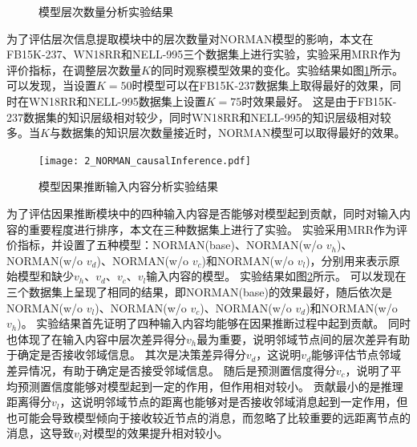 \documentclass[algorithmlist, AutoFakeBold, AutoFakeSlant, figurelist, tablelist, nomlist, engineering]{seuthesix}
\begin{document}
\begin{figure}[t]
  \centering
  \caption{模型层次数量分析实验结果}
  \label{Experiment1_layer}
\end{figure}
为了评估层次信息提取模块中的层次数量对NORMAN模型的影响，本文在FB15K-237、WN18RR和NELL-995三个数据集上进行实验，实验采用MRR作为评价指标，在调整层次数量$K$的同时观察模型效果的变化。实验结果如图\ref{Experiment1_layer}所示。
可以发现，当设置$K=50$时模型可以在FB15K-237数据集上取得最好的效果，同时在WN18RR和NELL-995数据集上设置$K=75$时效果最好。
这是由于FB15K-237数据集的知识层级相对较少，同时WN18RR和NELL-995的知识层级相对较多。当$K$与数据集的知识层次数量接近时，NORMAN模型可以取得最好的效果。

\begin{figure}[t]
  \centering
  \texttt{[image: 2\_NORMAN\_causalInference.pdf]}
  \caption{模型因果推断输入内容分析实验结果}
  \label{Experiment1_causalInference}
\end{figure}
为了评估因果推断模块中的四种输入内容是否能够对模型起到贡献，同时对输入内容的重要程度进行排序，本文在三种数据集上进行了实验。
实验采用MRR作为评价指标，并设置了五种模型：NORMAN(base)、NORMAN(w/o $v_h$)、NORMAN(w/o $v_d$)、NORMAN(w/o $v_c$)和NORMAN(w/o $v_l$)，分别用来表示原始模型和缺少$v_h$、$v_d$、$v_c$、$v_l$输入内容的模型。
实验结果如图\ref{Experiment1_causalInference}所示。
可以发现在三个数据集上呈现了相同的结果，即NORMAN(base)的效果最好，随后依次是NORMAN(w/o $v_l$)、NORMAN(w/o $v_c$)、NORMAN(w/o $v_d$)和NORMAN(w/o $v_h$)。
实验结果首先证明了四种输入内容均能够在因果推断过程中起到贡献。
同时也体现了在输入内容中层次差异得分$v_h$最为重要，说明邻域节点间的层次差异有助于确定是否接收邻域信息。
其次是决策差异得分$v_d$，这说明$v_d$能够评估节点邻域差异情况，有助于确定是否接受邻域信息。
随后是预测置信度得分$v_c$，说明了平均预测置信度能够对模型起到一定的作用，但作用相对较小。
贡献最小的是推理距离得分$v_l$，这说明邻域节点的距离也能够对是否接收邻域消息起到一定作用，但也可能会导致模型倾向于接收较近节点的消息，而忽略了比较重要的远距离节点的消息，这导致$v_l$对模型的效果提升相对较小。
\end{document}

